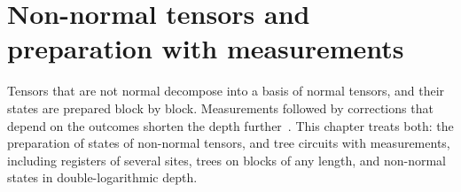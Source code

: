 \chapter{Non-normal tensors and preparation with measurements}
\label{ch:log_depth_non_normal}

Tensors that are not normal decompose into a basis of normal tensors, and their
states are prepared block by block. Measurements followed by corrections that
depend on the outcomes shorten the depth further~\cite{Malz2024Preparation}.
This chapter treats both: the preparation of states of non-normal tensors, and
tree circuits with measurements, including registers of several sites, trees
on blocks of any length, and non-normal states in double-logarithmic depth.


